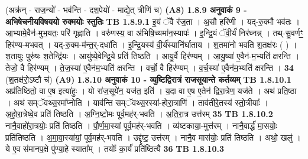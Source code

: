 \documentclass[17pt]{extarticle}
\begin{document}
                                    (अक्र॑न् - राज॒न्यो॑ - भव॑न्ति - दश॒पेयो॑ - माद्ये॒त् त्रीणि॑ च) \textbf{(A8)} \newline \newline
                \textbf{ 1.8.9      अनुवाकं   9 - अभिषेचनीयविषययो रुक्मयोः स्तुतिः} \newline
                                \textbf{ TB 1.8.9.1} \newline
                  इ॒यं ॅवै र॑ज॒ता । अ॒सौ हरि॑णी । यद्-रु॒क्मौ भव॑तः । आ॒भ्यामे॒वैन॑-मुभ॒यतः॒ परि॑ गृह्णाति । वरु॑णस्य॒ वा अ॑भिषि॒च्यमा॑न॒स्यापः॑ । इ॒न्द्रि॒यं ॅवी॒र्यं॑ निर॑घ्नन्न् । तथ्-सु॒वर्णꣳ॒॒ हिर॑ण्य-मभवत् । यद्-रु॒क्म-म॑न्त॒र्-दधा॑ति । इ॒न्द्रि॒यस्य॑ वी॒र्य॑स्यानि॑र्घाताय । श॒तमा॑नो भवति श॒तक्ष॑रः ( ) । श॒तायुः॒ पुरु॑षः श॒तेन्द्रि॑यः । आयु॑ष्ये॒वेन्द्रि॒ये प्रति॑ तिष्ठति । आयु॒र्वै हिर॑ण्यम् । आ॒यु॒ष्या॑ ए॒वैन॑-म॒भ्यति॑ क्षरन्ति । तेजो॒ वै हिर॑ण्यम् । ते॒ज॒स्या॑ ए॒वैन॑म॒भ्यति॑ क्षरन्ति । वर्चो॒ वै हिर॑ण्यम् । व॒र्च॒स्या॑ ए॒वैन॑म॒भ्यति॑ क्षरन्ति । \textbf{ 34} \newline
                  \newline
                                    (श॒तक्ष॑रो॒ऽष्टौ च॑) \textbf{(A9)} \newline \newline
                \textbf{ 1.8.10    अनुवाकं   10 - व्युष्टिद्विरात्रं राजसूयान्ते कर्तव्यम्} \newline
                                \textbf{ TB 1.8.10.1} \newline
                  अप्र॑तिष्ठितो॒ वा ए॒ष इत्या॑हुः । यो रा॑ज॒सूये॑न॒ यज॑त॒ इति॑ । य॒दा वा ए॒ष ए॒तेन॑ द्विरा॒त्रेण॒ यज॑ते । अथ॑ प्रति॒ष्ठा । अथ॑ सम्ॅवथ्स॒रमा᳚प्नोति । याव॑न्ति सम्ॅवथ्स॒रस्या॑-होरा॒त्राणि॑ । ताव॑तीरे॒तस्य॑ स्तो॒त्रीयाः᳚ । अ॒हो॒रा॒त्रेष्वे॒व प्रति॑ तिष्ठति । अ॒ग्नि॒ष्टो॒मः पूर्व॒मह॑र्-भवति । अ॒ति॒रा॒त्र उत्त॑रम् \textbf{ 35} \newline
                  \newline
                                \textbf{ TB 1.8.10.2} \newline
                  नानै॒वाहो॑रा॒त्रयोः॒ प्रति॑ तिष्ठति । पौ॒र्ण॒मा॒स्यां पूर्व॒मह॑र्-भवति । व्य॑ष्टकाया॒-मुत्त॑रम् । नानै॒वार्द्ध॑ मा॒सयोः॒ प्रति॑तिष्ठति । अ॒मा॒वा॒स्या॑यां॒ पूर्व॒मह॑र्-भवति । उद्दृ॑ष्ट॒ उत्त॑रम् । नानै॒व मास॑योः॒ प्रति॑ तिष्ठति । अथो॒ खलु॑ । ये ए॒व स॑मानप॒क्षे पु॑ण्या॒हे स्याता᳚म् । तयोः᳚ का॒र्यं॑ प्रति॑ष्ठित्यै \textbf{ 36} \newline
                  \newline
                                \textbf{ TB 1.8.10.3} \newline
\end{document}
